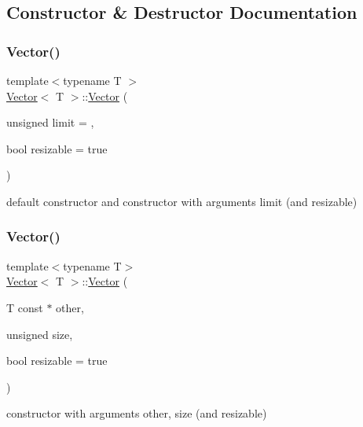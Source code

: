 \subsection{Constructor \& Destructor Documentation}
\mbox{\label{classVector_a2d2738e562188d3c4e08c3fc7075dc0a}} 
\subsubsection{\texorpdfstring{Vector()}{Vector()}\hspace{0.1cm}{\footnotesize\ttfamily [1/3]}}
{\footnotesize\ttfamily template$<$typename T $>$ \\
\hyperlink{classVector}{Vector}$<$ T $>$\+::\hyperlink{classVector}{Vector} (\begin{DoxyParamCaption}\item[{unsigned}]{limit = {},  }\item[{bool}]{resizable = {\ttfamily true} }\end{DoxyParamCaption})}



default constructor and constructor with arguments limit (and resizable) 

\mbox{\label{classVector_a363b28b2093e32cb4ee93148c065782b}} 
\subsubsection{\texorpdfstring{Vector()}{Vector()}\hspace{0.1cm}{\footnotesize\ttfamily [2/3]}}
{\footnotesize\ttfamily template$<$typename T$>$ \\
\hyperlink{classVector}{Vector}$<$ T $>$\+::\hyperlink{classVector}{Vector} (\begin{DoxyParamCaption}\item[{T const $\ast$}]{other,  }\item[{unsigned}]{size,  }\item[{bool}]{resizable = {\ttfamily true} }\end{DoxyParamCaption})}



constructor with arguments other, size (and resizable) 

\mbox{\label{classVector_a857e13a3af4fb6e3eea77935cfcd4ef2}} 
